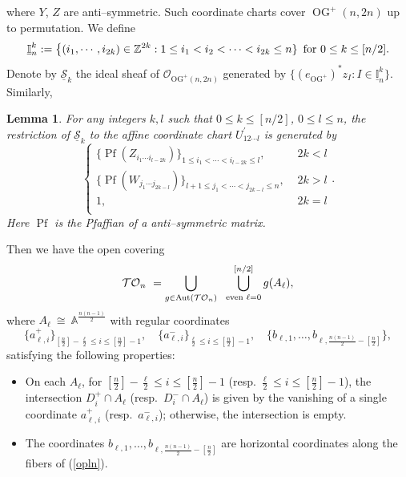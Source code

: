 \documentclass[10pt]{amsart}
\newtheorem{lemma}[theorem]{Lemma}
\theoremstyle{definition}
\newcommand{\A}{\mathbb{A}}
\newcommand{\OG}{\operatorname{OG}}
\newcommand{\TO}{\mathcal{TO}}
\theoremstyle{plain} %
\begin{document}
where $Y$, $Z$ are anti--symmetric. Such coordinate charts cover $\OG^+(n,2n)$ up to permutation.
We define  
\begin{equation*}%
\underline{\mathbb I}_{n}^{k}:=\big\{(i_1,\cdots,i_{2k})\in\mathbb Z^{2k}: 1\leq i_1<i_2<\cdots<i_{2k}\leq n\}\,\,\,{\rm for}\,\,0\leq k\leq [n/2]. 
\end{equation*}
Denote by $\underline{\mathcal S}_k$ the ideal sheaf of $\mathcal O_{\mathrm{OG}^+(n,2n)}$ generated by $\{\left(e_{\mathrm{OG}^+}\right)^*z_{I}:{I\in \underline{\mathbb I}_{n}^k}\}$. %
Similarly, 
\begin{lemma}\label{sepao}
For any integers $k,l$ such that $0\leq k\leq [n/2]$, $0\leq l\leq n$,  the restriction of $\underline{\mathcal S}_k$ to the affine coordinate chart $U^{\prime}_{12\cdots l}$ is generated by   
\begin{equation*}
   \left\{\begin{array}{ll}
    \{\operatorname{Pf}(Z_{i_1\cdots i_{l-2k}})\}_{1\leq i_1<\cdots <i_{l-2k}\leq l},\,\,&2k<l \\
    \{\operatorname{Pf}(W_{j_1\cdots j_{2k-l}})\}_{l+1\leq j_1<\cdots <j_{2k-l}\leq n}, \,\,&2k>l\\
       1,\,\,&2k=l\\
   \end{array}\right.. 
\end{equation*}
Here $\operatorname{Pf}$ is the Pfaffian of a anti--symmetric matrix.
\end{lemma}

Then we have the open covering 
\[
\TO_n \ =\bigcup_{g \in \operatorname{Aut}(\TO_n)} \; \ \bigcup_{{\rm even}\,\,\ell=0}^{[n/2]} g(A_\ell),
\]
where 
\(
A_\ell \ \cong\ \A^{\frac{n(n-1)}{2}}
\)
with regular coordinates 
\[
\bigl\{
a_{\ell,i}^+\bigr\}_{[\frac{n}{2}]-\frac{\ell}{2}\le i\le [\frac{n}{2}]-1},
\quad
\bigl\{a_{\ell,i}^-\bigr\}_{\frac{\ell}{2}\leq i\leq [\frac{n}{2}]-1},
\quad
\bigl\{b_{\ell,1},\dots,b_{\ell,\frac{n(n-1)}{2}-[\frac{n}{2}]}\bigr\},
\]
satisfying the following properties:

\begin{itemize}
\item[-] On each $A_\ell$, for $[\frac{n}{2}]-\frac{\ell}{2}\leq i\leq [\frac{n}{2}]-1$ (resp. $\frac{\ell}{2}\leq i\leq [\frac{n}{2}]-1$), the intersection
$D_i^+\cap A_\ell$ (resp.\ $D_i^-\cap A_\ell$) is given by the vanishing
of a single coordinate $a_{\ell,i}^+$ (resp.\ $a_{\ell,i}^-$); otherwise, the intersection is empty.


\item[-] The coordinates $b_{\ell,1},\dots,b_{\ell,\frac{n(n-1)}{2}-[\frac{n}{2}]}$ are
horizontal coordinates along the fibers of (\ref{opln}).
\end{itemize}
\end{document}
